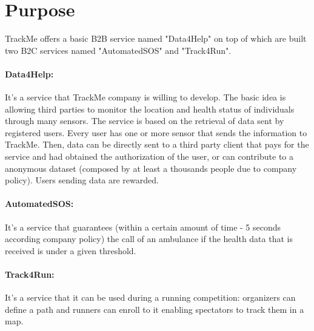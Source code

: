 \documentclass[../../rasd.tex]{subfiles}
\begin{document}
\section{Purpose}
			TrackMe offers a basic B2B service named "Data4Help" on top of which are built two B2C services named "AutomatedSOS" and "Track4Run".
			\paragraph{Data4Help:}It's a service that TrackMe company is willing to develop. The basic idea is allowing third parties to monitor the location and health status of individuals through many sensors. The service is based on the retrieval of data sent by registered users. Every user has one or more sensor that sends the information to TrackMe. Then, data can be directly sent to a third party client that pays for the service and had obtained the authorization of the user, or can contribute to a anonymous dataset (composed by at least a thousands people due to company policy). Users sending data are rewarded.\\
			
			\paragraph{AutomatedSOS:}It's a service that guarantees (within a certain amount of time - 5 seconds according company policy) the call of an ambulance if the health data that is received is under a given threshold.
			
			\paragraph{Track4Run:}It's a service that it can be used during a running competition: organizers can define a path and runners can enroll to it enabling spectators to track them in a map.
\end{document}
